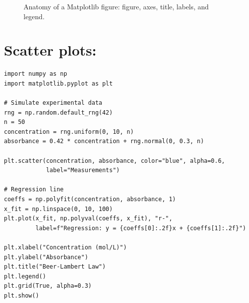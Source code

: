 \begin{figure}[ht]
\centering
{}
\caption{Anatomy of a Matplotlib figure: figure, axes, title, labels, and legend.}
\label{fig:matplotlib-anatomie}
\end{figure}

\section{Scatter plots: }

\begin{codeblock}[title=\textbf{Python}]
\begin{verbatim}
import numpy as np
import matplotlib.pyplot as plt

# Simulate experimental data
rng = np.random.default_rng(42)
n = 50
concentration = rng.uniform(0, 10, n)
absorbance = 0.42 * concentration + rng.normal(0, 0.3, n)

plt.scatter(concentration, absorbance, color="blue", alpha=0.6,
            label="Measurements")

# Regression line
coeffs = np.polyfit(concentration, absorbance, 1)
x_fit = np.linspace(0, 10, 100)
plt.plot(x_fit, np.polyval(coeffs, x_fit), "r-",
         label=f"Regression: y = {coeffs[0]:.2f}x + {coeffs[1]:.2f}")

plt.xlabel("Concentration (mol/L)")
plt.ylabel("Absorbance")
plt.title("Beer-Lambert Law")
plt.legend()
plt.grid(True, alpha=0.3)
plt.show()
\end{verbatim}
\end{codeblock}

